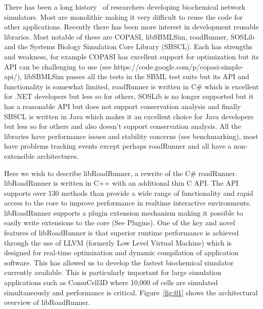 \documentclass{bioinfo}
\begin{document}
There has been a long history~\citep{Bag01} of researchers developing biochemical network simulators. Most are monolithic making it very difficult to reuse the code for other applications. Recently there has been more interest in development reusable libraries. Most notable of these are COPASI, libSBMLSim, roadRunner, SOSLib and the Systems Biology Simulation Core Library (SBSCL). Each has strengths and weakness, for example COPASI has excellent support for optimization but its API can be challenging to use (see https://code.google.com/p/copasi-simple-api/), libSBMLSim passes all the tests in the SBML test suite but its API and functionality is somewhat limited, roadRunner is written in C\# which is excellent for .NET developers but less so for others, SOSLib is no longer supported but it has a reasonable API but does not support conservation analysis and finally SBSCL is written in Java which makes it an excellent choice for Java developers but less so for others and also doesn't support conservation analysis. All the libraries have performance issues and stability concerns (see benchmarking), most have problems tracking events except perhaps roadRunner and all have a non-extensible architectures.

Here we wish to describe libRoadRunner, a rewrite of the C\# roadRunner. libRoadRunner is written in C++ with an additional thin C API. The API supports over 130 methods than provide a wide range of functionality and rapid access to the core to improve performance in realtime interactive environments. libRoadRunner supports a plugin extension mechanism making it possible to easily write extensions to the core (See Plugins). One of the key and novel features of libRoadRunner is that superior runtime performance is achieved through the use of LLVM (formerly Low Level Virtual Machine) which is designed for real-time optimization and dynamic compilation of application software. This has allowed us to develop the fastest biochemical simulator currently available. This is particularly important for large simulation applications such as ComuCell3D where 10,000 of cells are simulated simultaneously and performance is critical. Figure~\ref{fig:01} shows the architectural overview of libRoadRunner.
\end{document}
